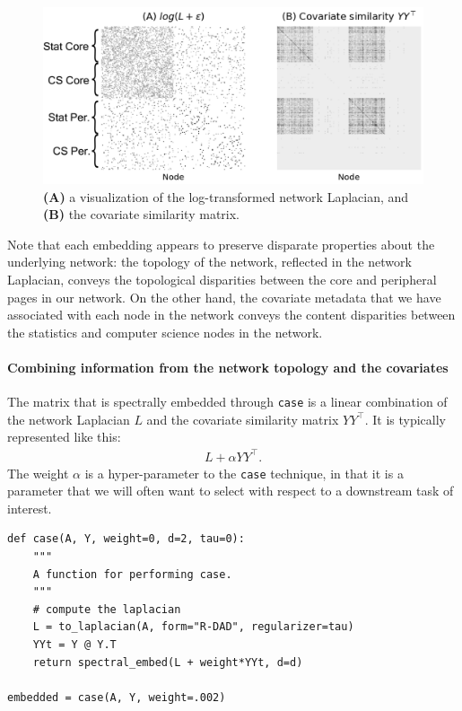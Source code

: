 \begin{figure}
    \centering
    \includegraphics[width=\linewidth]{representations/ch6/Images/casc_inputs.png}
    \caption[inputs to \texttt{case}]{\textbf{(A)} a visualization of the log-transformed network Laplacian, and \textbf{(B)} the covariate similarity matrix.}
    \label{fig:ch6:casc:casc_inputs}
\end{figure}

Note that each embedding appears to preserve disparate properties about the underlying network: the topology of the network, reflected in the network Laplacian, conveys the topological disparities between the core and peripheral pages in our network. On the other hand, the covariate metadata that we have associated with each node in the network conveys the content disparities between the statistics and computer science nodes in the network. 

\paragraph*{Combining information from the network topology and the covariates}

The matrix that is spectrally embedded through \texttt{case} is a linear combination of the network Laplacian $L$ and the covariate similarity matrix $YY^\top$. It is typically represented like this:
\begin{align*}
    L + \alpha YY^\top.
\end{align*}
The weight $\alpha$ is a hyper-parameter to the \texttt{case} technique, in that it is a parameter that we will often want to select with respect to a downstream task of interest. 

\begin{lstlisting}[style=python]
def case(A, Y, weight=0, d=2, tau=0):
    """
    A function for performing case.
    """
    # compute the laplacian
    L = to_laplacian(A, form="R-DAD", regularizer=tau)
    YYt = Y @ Y.T
    return spectral_embed(L + weight*YYt, d=d)

embedded = case(A, Y, weight=.002)
\end{lstlisting}

